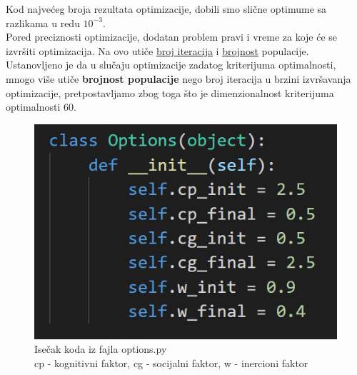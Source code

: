 \documentclass[12pt, a4paper]{article}
\begin{document}
    Kod najvećeg broja rezultata optimizacije, dobili smo slične optimume sa razlikama
    u redu $10^{-3}$.\\
    Pored preciznosti optimizacije, dodatan problem pravi i vreme za koje će se izvršiti
    optimizacija. Na ovo utiče \underline{broj iteracija} i \underline{brojnost} populacije. Ustanovljeno je da u slučaju optimizacije zadatog kriterijuma
    optimalnosti, mnogo više utiče \textbf{brojnost populacije} nego broj iteracija u brzini
    izvršavanja optimizacije, pretpostavljamo zbog toga što je dimenzionalnost kriterijuma
    optimalnosti 60.
    
    \vspace{20mm}
    
    \begin{figure}[h]
        \centering
        \includegraphics[scale=0.5]{Options_class.png}
        \caption{Isečak koda iz fajla options.py\\cp - kognitivni faktor, cg - socijalni faktor, w - inercioni faktor}
        \label{fig:code_snippet}
    \end{figure}
    
    
\end{document}
